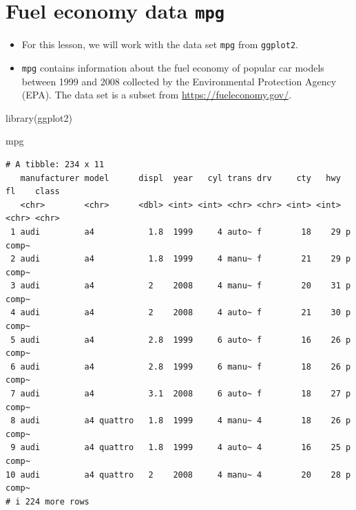 \documentclass[
  letterpaper,
  DIV=11,
  numbers=noendperiod]{scrreprt}
\newenvironment{Shaded}{\begin{snugshade}}{\end{snugshade}}
\newcommand{\FunctionTok}[1]{\textcolor[rgb]{0.28,0.35,0.67}{#1}}
\newcommand{\NormalTok}[1]{\textcolor[rgb]{0.00,0.23,0.31}{#1}}
\begin{document}
\section{\texorpdfstring{Fuel economy data
\texttt{mpg}}{Fuel economy data mpg}}\label{fuel-economy-data-mpg}

\begin{itemize}
\item
  For this lesson, we will work with the data set \texttt{mpg} from
  \texttt{ggplot2}.
\item
  \texttt{mpg} contains information about the fuel economy of popular
  car models between 1999 and 2008 collected by the Environmental
  Protection Agency (EPA). The data set is a subset from
  \url{https://fueleconomy.gov/}.
\end{itemize}

\begin{Shaded}
\begin{Highlighting}[]
\FunctionTok{library}\NormalTok{(ggplot2)}

\NormalTok{mpg}
\end{Highlighting}
\end{Shaded}

\begin{verbatim}
# A tibble: 234 x 11
   manufacturer model      displ  year   cyl trans drv     cty   hwy fl    class
   <chr>        <chr>      <dbl> <int> <int> <chr> <chr> <int> <int> <chr> <chr>
 1 audi         a4           1.8  1999     4 auto~ f        18    29 p     comp~
 2 audi         a4           1.8  1999     4 manu~ f        21    29 p     comp~
 3 audi         a4           2    2008     4 manu~ f        20    31 p     comp~
 4 audi         a4           2    2008     4 auto~ f        21    30 p     comp~
 5 audi         a4           2.8  1999     6 auto~ f        16    26 p     comp~
 6 audi         a4           2.8  1999     6 manu~ f        18    26 p     comp~
 7 audi         a4           3.1  2008     6 auto~ f        18    27 p     comp~
 8 audi         a4 quattro   1.8  1999     4 manu~ 4        18    26 p     comp~
 9 audi         a4 quattro   1.8  1999     4 auto~ 4        16    25 p     comp~
10 audi         a4 quattro   2    2008     4 manu~ 4        20    28 p     comp~
# i 224 more rows
\end{verbatim}
\end{document}
